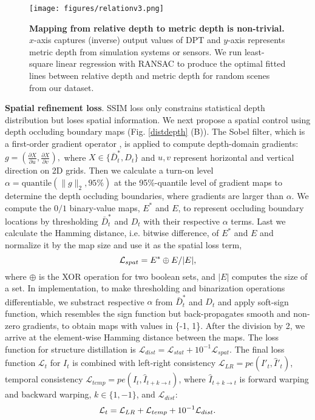 \documentclass[10pt,twocolumn,letterpaper]{article}
\begin{document}
\begin{figure}[bt!]
    \centering
    \texttt{[image: figures/relationv3.png]}
    \vspace{-12pt}
    \caption{\textbf{Mapping from relative depth to metric depth is non-trivial.} $x$-axis captures (inverse) output values of DPT and $y$-axis represents metric depth from simulation systems or sensors. We run least-square linear regression with RANSAC to produce the optimal fitted lines between relative depth and metric depth for random scenes from our dataset.}
    \vspace{-8pt}
    \label{relation}
\end{figure}

\textbf{Spatial refinement loss}. SSIM loss only constrains statistical depth distribution but loses spatial information. We next propose a spatial control using depth occluding boundary maps (Fig. \ref{distdepth} (B)). The Sobel filter, which is a first-order gradient operator \cite{kanopoulos1988design}, is applied to compute depth-domain gradients: $g=(\frac{\partial X}{\partial u}, \frac{\partial X}{\partial v}),$ where $X \in \{\bar{D}_t^*, D_t\}$ and $u,v$ represent horizontal and vertical direction on 2D grids. Then we calculate a turn-on level $\alpha=\text{quantile}(\|g\|_2, 95\%)$ at the 95\%-quantile level of gradient maps to determine the depth occluding boundaries, where gradients are larger than $\alpha$. We compute the $0/1$ binary-value maps, $E^*$ and $E$, to represent occluding boundary locations by thresholding $\bar{D}_t^*$ and $D_t$ with their respective $\alpha$ terms. Last we calculate the Hamming distance, i.e. bitwise difference, of $E^*$ and $E$ and normalize it by the map size and use it as the spatial loss term,
\begin{equation}
    \vspace{-2pt}
     \mathcal{L}_{spat}= E^* \oplus E/|E|,
     \vspace{-2pt}
\label{loss_spatial}
\end{equation}
where $\oplus$ is the XOR operation for two boolean sets, and $|E|$ computes the size of a set. In implementation, to make thresholding and binarization operations differentiable, we substract respective $\alpha$ from $\bar{D}_t^*$ and $D_t$ and apply soft-sign function, which resembles the sign function but back-propagates smooth and non-zero gradients, to obtain maps with values in \{-1, 1\}. After the division by 2, we arrive at the element-wise Hamming distance between the maps. The loss function for structure distillation is $\mathcal{L}_{dist}=\mathcal{L}_{stat}+10^{-1}\mathcal{L}_{spat}$. The final loss function $\mathcal{L}_t$ for $I_t$ is combined with left-right  consistency $\mathcal{L}_{LR}= pe(I'_t, \hat{I}'_t)$, temporal consistency $\mathcal{L}_{temp}= pe(I_t, \hat{I}_{t+k \to t})$, where $\hat{I}_{t+k \to t}$ is forward warping and backward warping, $k \in \{1, -1\}$, and $\mathcal{L}_{dist}$:
\begin{equation}
\vspace{-3pt}
     \mathcal{L}_t = \mathcal{L}_{LR}+\mathcal{L}_{temp}+10^{-1}\mathcal{L}_{dist}.
\label{total_loss}
\vspace{-3pt}
\end{equation}
\end{document}
